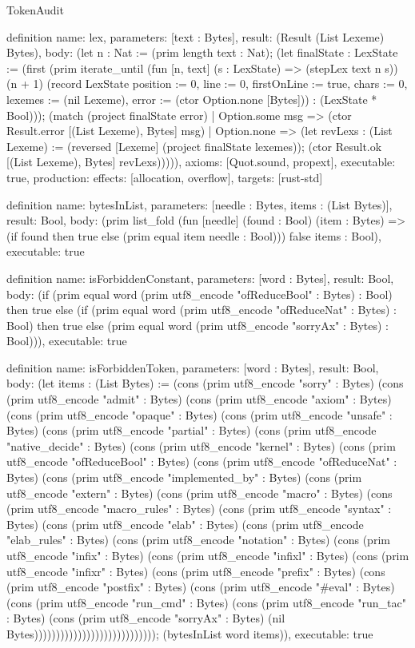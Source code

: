 \begin{lexlean}{TokenAudit}
\begin{semanticmodule}
definition{
  name: lex,
  parameters: [text : Bytes],
  result: (Result (List Lexeme) Bytes),
  body: (let n : Nat := (prim length text : Nat); (let finalState : LexState := (first (prim iterate_until (fun [n, text] (s : LexState) => (stepLex text n s)) (n + 1) (record LexState {position := 0, line := 0, firstOnLine := true, chars := 0, lexemes := (nil Lexeme), error := (ctor Option.none [Bytes])}) : (LexState * Bool))); (match (project finalState error)
    | Option.some msg => (ctor Result.error [(List Lexeme), Bytes] msg)
    | Option.none => (let revLexs : (List Lexeme) := (reversed [Lexeme] (project finalState lexemes)); (ctor Result.ok [(List Lexeme), Bytes] revLexs))))),
  axioms: [Quot.sound, propext],
  executable: true,
  production: {effects: [allocation, overflow], targets: [rust-std]}
}

definition{
  name: bytesInList,
  parameters: [needle : Bytes, items : (List Bytes)],
  result: Bool,
  body: (prim list_fold (fun [needle] (found : Bool) (item : Bytes) => (if found then true else (prim equal item needle : Bool))) false items : Bool),
  executable: true
}

definition{
  name: isForbiddenConstant,
  parameters: [word : Bytes],
  result: Bool,
  body: (if (prim equal word (prim utf8_encode "ofReduceBool" : Bytes) : Bool) then true else (if (prim equal word (prim utf8_encode "ofReduceNat" : Bytes) : Bool) then true else (prim equal word (prim utf8_encode "sorryAx" : Bytes) : Bool))),
  executable: true
}

definition{
  name: isForbiddenToken,
  parameters: [word : Bytes],
  result: Bool,
  body: (let items : (List Bytes) := (cons (prim utf8_encode "sorry" : Bytes) (cons (prim utf8_encode "admit" : Bytes) (cons (prim utf8_encode "axiom" : Bytes) (cons (prim utf8_encode "opaque" : Bytes) (cons (prim utf8_encode "unsafe" : Bytes) (cons (prim utf8_encode "partial" : Bytes) (cons (prim utf8_encode "native_decide" : Bytes) (cons (prim utf8_encode "kernel" : Bytes) (cons (prim utf8_encode "ofReduceBool" : Bytes) (cons (prim utf8_encode "ofReduceNat" : Bytes) (cons (prim utf8_encode "implemented_by" : Bytes) (cons (prim utf8_encode "extern" : Bytes) (cons (prim utf8_encode "macro" : Bytes) (cons (prim utf8_encode "macro_rules" : Bytes) (cons (prim utf8_encode "syntax" : Bytes) (cons (prim utf8_encode "elab" : Bytes) (cons (prim utf8_encode "elab_rules" : Bytes) (cons (prim utf8_encode "notation" : Bytes) (cons (prim utf8_encode "infix" : Bytes) (cons (prim utf8_encode "infixl" : Bytes) (cons (prim utf8_encode "infixr" : Bytes) (cons (prim utf8_encode "prefix" : Bytes) (cons (prim utf8_encode "postfix" : Bytes) (cons (prim utf8_encode "#eval" : Bytes) (cons (prim utf8_encode "run_cmd" : Bytes) (cons (prim utf8_encode "run_tac" : Bytes) (cons (prim utf8_encode "sorryAx" : Bytes) (nil Bytes)))))))))))))))))))))))))))); (bytesInList word items)),
  executable: true
}


\end{semanticmodule}
\end{lexlean}
